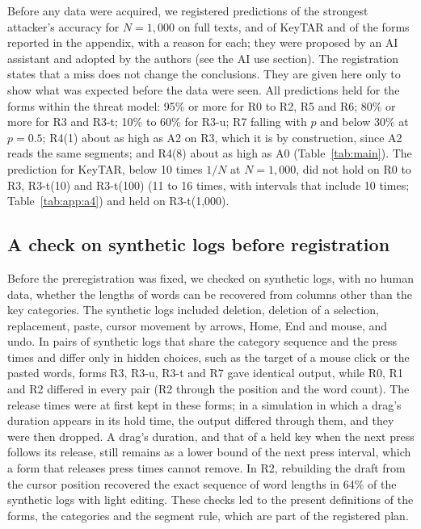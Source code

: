 Before any data were acquired, we registered predictions of the strongest attacker's accuracy for $N = 1{,}000$ on full
texts, and of KeyTAR and of the forms reported in the appendix, with a reason for each; they were proposed by an AI assistant and adopted by the authors (see the AI use
section). The registration states that a miss does not change the conclusions. They are given here only to show what was expected before the data were seen. All predictions held for the forms within the threat model: 95\% or more for R0 to R2, R5 and R6; 80\% or
more for R3 and R3-t; 10\% to 60\% for R3-u; R7 falling with $p$ and below 30\% at $p = 0.5$; R4(1) about as high as
A2 on R3, which it is by construction, since A2 reads the same segments; and R4(8) about as high as A0
(Table~\ref{tab:main}). The prediction for KeyTAR, below 10 times $1/N$ at $N = 1{,}000$, did not hold on R0 to R3,
R3-t(10) and R3-t(100) (11 to 16 times, with intervals that include 10 times; Table~\ref{tab:app:a4}) and held on R3-t(1{,}000).

\subsection{A check on synthetic logs before registration}
\label{app:checks:synthetic}

Before the preregistration was fixed, we checked on synthetic logs, with no human data, whether the lengths of words
can be recovered from columns other than the key categories. The synthetic logs included deletion, deletion of a
selection, replacement, paste, cursor movement by arrows, Home, End and mouse, and undo. In pairs of synthetic logs
that share the category sequence and the press times and differ only in hidden choices, such as the target of a mouse
click or the pasted words, forms R3, R3-u, R3-t and R7 gave identical output, while R0, R1 and R2 differed in every
pair (R2 through the position and the word count). The release times were at first kept in these forms; in a
simulation in which a drag's duration appears in its hold time, the output differed through them, and they were then
dropped. A drag's duration, and that of a held key when the next press follows its release, still remains as a lower
bound of the next press interval, which a form that releases press times cannot remove. In R2, rebuilding the draft
from the cursor position recovered the exact sequence of word lengths in 64\% of the synthetic logs with light
editing. These checks led to the present definitions of the forms, the categories and the segment rule, which are part
of the registered plan.

